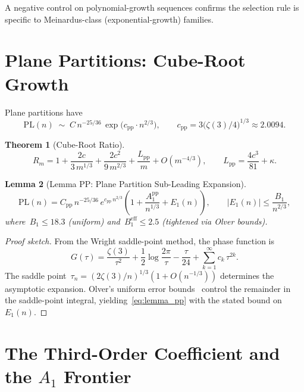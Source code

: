 \documentclass[11pt,a4paper]{article}
\newtheorem{theorem}{Theorem}[section]
\newtheorem{lemma}[theorem]{Lemma}
\begin{document}
A negative control on polynomial-growth sequences confirms the selection rule is specific to Meinardus-class (exponential-growth) families.

\section{Plane Partitions: Cube-Root Growth}\label{sec:plane_partitions}

Plane partitions have
\[
  \mathrm{PL}(n) \;\sim\; C\,n^{-25/36}\,\exp\!\bigl(c_{\mathrm{pp}} \cdot n^{2/3}\bigr),
  \qquad c_{\mathrm{pp}} = 3\bigl(\zeta(3)/4\bigr)^{1/3} \approx 2.0094.
\]

\begin{theorem}[Cube-Root Ratio]\label{thm:cuberoot}
\begin{equation}\label{eq:cuberoot}
  R_m = 1 + \frac{2c}{3\,m^{1/3}} + \frac{2c^2}{9\,m^{2/3}} + \frac{L_{\mathrm{pp}}}{m} + O(m^{-4/3}),
  \qquad L_{\mathrm{pp}} = \frac{4c^3}{81} + \kappa.
\end{equation}
\end{theorem}

\begin{lemma}[Lemma PP: Plane Partition Sub-Leading Expansion]\label{lem:pp}
\begin{equation}\label{eq:lemma_pp}
  \mathrm{PL}(n) = C_{\mathrm{pp}}\,n^{-25/36}\,e^{c_{\mathrm{pp}}\,n^{2/3}}\!\left(1 + \frac{A_1^{\mathrm{pp}}}{n^{1/3}} + E_1(n)\right),
  \qquad |E_1(n)| \leq \frac{B_1}{n^{2/3}},
\end{equation}
where~$B_1 \leq 18.3$ (uniform) and~$B_1^{\mathrm{eff}} \leq 2.5$ (tightened via Olver bounds).
\end{lemma}

\begin{proof}[Proof sketch]
From the Wright saddle-point method, the phase function is
\[
  G(\tau) = \frac{\zeta(3)}{\tau^2} + \frac{1}{2}\log\frac{2\pi}{\tau} - \frac{\tau}{24} + \sum_{k=1}^{\infty} c_k\,\tau^{2k}.
\]
The saddle point~$\tau_n = (2\zeta(3)/n)^{1/3}(1 + O(n^{-1/3}))$ determines the asymptotic expansion. Olver's uniform error bounds~\cite{olver1974} control the remainder in the saddle-point integral, yielding~\eqref{eq:lemma_pp} with the stated bound on~$E_1(n)$.
\end{proof}

\section{The Third-Order Coefficient and the \texorpdfstring{$A_1$}{A1} Frontier}\label{sec:A1}
\end{document}
